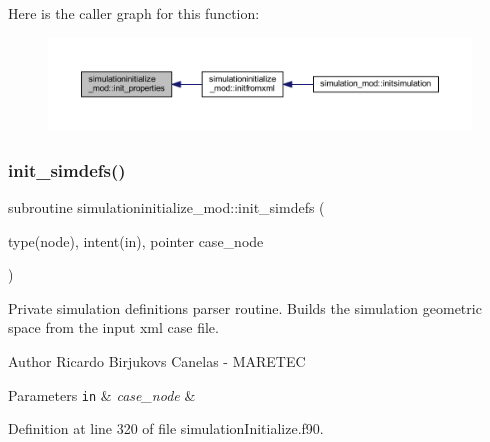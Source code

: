 Here is the caller graph for this function\+:\nopagebreak
\begin{figure}[H]
\begin{center}
\leavevmode
\includegraphics[width=350pt]{namespacesimulationinitialize__mod_a532cb4960e93dc27cff5dc2e04afe070_icgraph}
\end{center}
\end{figure}
\mbox{\label{namespacesimulationinitialize__mod_af6b2508d52e9e29aeb6e7dfbabd88e8d}} 
\subsubsection{\texorpdfstring{init\+\_\+simdefs()}{init\_simdefs()}}
{\footnotesize\ttfamily subroutine simulationinitialize\+\_\+mod\+::init\+\_\+simdefs (\begin{DoxyParamCaption}\item[{type(node), intent(in), pointer}]{case\+\_\+node }\end{DoxyParamCaption})\hspace{0.3cm}{\ttfamily [private]}}



Private simulation definitions parser routine. Builds the simulation geometric space from the input xml case file. 

\begin{DoxyAuthor}{Author}
Ricardo Birjukovs Canelas -\/ M\+A\+R\+E\+T\+EC 
\end{DoxyAuthor}

\begin{DoxyParams}[1]{Parameters}
\mbox{\tt in}  & {\em case\+\_\+node} & \\
\hline
\end{DoxyParams}


Definition at line 320 of file simulation\+Initialize.\+f90.


